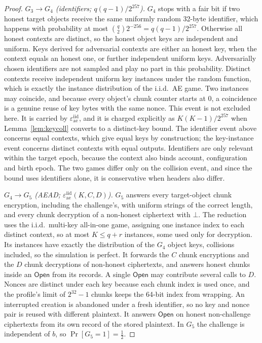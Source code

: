 \documentclass[pdflatex,sn-mathphys-num]{sn-jnl}
\theoremstyle{plain}
\theoremstyle{definition}
\begin{document}
\begin{proof}
\emph{$G_3\to G_4$ (identifiers; $q(q-1)/2^{257}$).} $G_4$ stops with a fair bit if two honest target objects receive the same uniformly random 32-byte identifier, which happens with probability at most $\binom q2 2^{-256}=q(q-1)/2^{257}$. Otherwise all honest contexts are distinct, so the honest object keys are independent and uniform. Keys derived for adversarial contexts are either an honest key, when the context equals an honest one, or further independent uniform keys. Adversarially chosen identifiers are not sampled and play no part in this probability. Distinct contexts receive independent uniform key instances under the random function, which is exactly the instance distribution of the i.i.d.\ AE game. Two instances may coincide, and because every object's chunk counter starts at $0$, a coincidence is a genuine reuse of key bytes with the same nonce. This event is not excluded here. It is carried by $\varepsilon^{\mathrm{iid}}_{\mathrm{ae}}$, and it is charged explicitly as $K(K-1)/2^{257}$ when Lemma~\ref{lem:keycoll} converts to a distinct-key bound. The identifier event above concerns equal contexts, which give equal keys by construction; the key-instance event concerns distinct contexts with equal outputs. Identifiers are only relevant within the target epoch, because the context also binds account, configuration and birth epoch. The two games differ only on the collision event, and since the bound uses identifiers alone, it is conservative when headers also differ.

\emph{$G_4\to G_5$ (AEAD; $\varepsilon^{\mathrm{iid}}_{\mathrm{ae}}(K,C,D)$).} $G_5$ answers every target-object chunk encryption, including the challenge's, with uniform strings of the correct length, and every chunk decryption of a non-honest ciphertext with $\bot$. The reduction uses the i.i.d.\ multi-key all-in-one game, assigning one instance index to each distinct context, so at most $K\le q+r$ instances, some used only for decryption. Its instances have exactly the distribution of the $G_4$ object keys, collisions included, so the simulation is perfect. It forwards the $C$ chunk encryptions and the $D$ chunk decryptions of non-honest ciphertexts, and answers honest chunks inside an $\mathsf{Open}$ from its records. A single $\mathsf{Open}$ may contribute several calls to $D$. Nonces are distinct under each key because each chunk index is used once, and the profile's limit of $2^{32}-1$ chunks keeps the 64-bit index from wrapping. An interrupted creation is abandoned under a fresh identifier, so no key and nonce pair is reused with different plaintext. It answers $\mathsf{Open}$ on honest non-challenge ciphertexts from its own record of the stored plaintext. In $G_5$ the challenge is independent of $b$, so $\Pr[G_5=1]=\tfrac12$.


\end{proof}
\end{document}
